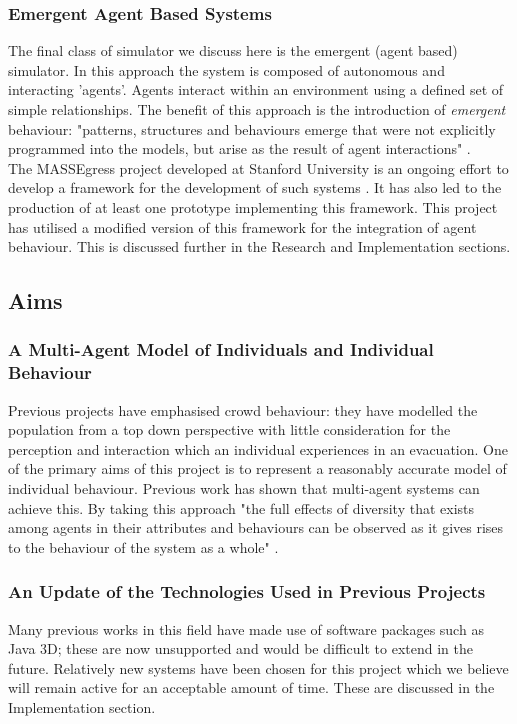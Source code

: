 \documentclass{article}
\begin{document}
\subsubsection{Emergent Agent Based Systems}
The final class of simulator we discuss here is the emergent (agent based) simulator. In this approach the system is composed of autonomous
and interacting 'agents'. Agents interact within an environment using a defined set of simple relationships. The benefit of this approach is the introduction
of \emph{emergent} behaviour: "patterns, structures and behaviours emerge that were not explicitly programmed into the models, but arise as the 
result of agent interactions" \cite{AgentBasedTutorial}.\\
The MASSEgress project developed at Stanford University is an ongoing effort to develop a framework for the development of such systems \cite{MultiAgentFramework,IndivPseudoCode}.
It has also led to the production of at least one prototype implementing this framework. 
This project has utilised a modified version of this framework for the integration
of agent behaviour. This is discussed further in the Research and Implementation sections.

\subsection{Aims}
\subsubsection{A Multi-Agent Model of Individuals and Individual Behaviour}
Previous projects have emphasised crowd behaviour: they have modelled the population from a top down 
perspective with little consideration for the perception and interaction which an individual experiences in an evacuation.
One of the primary aims of this project is to represent a reasonably accurate model of individual behaviour.
Previous work has shown that multi-agent systems can achieve this. By taking this approach "the full effects of diversity that exists among agents in their attributes and behaviours can be observed as it
gives rises to the behaviour of the system as a whole" \cite{AgentBasedTutorial}.

\subsubsection{An Update of the Technologies Used in Previous Projects}
Many previous works in this field have made use of software packages such as Java 3D; these are now unsupported and 
would be difficult to extend in the future. Relatively new systems have been chosen for this project which we believe will remain active for an acceptable amount of time.
These are discussed in the Implementation section.
\end{document}
